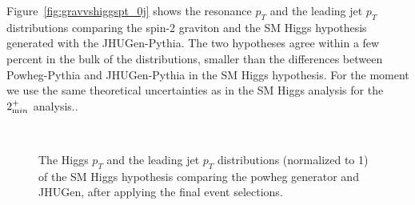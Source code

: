 Figure~\ref{fig:gravvshiggspt_0j} shows the resonance $p_T$ and 
the leading jet $p_T$ distributions comparing the spin-2 
graviton and the SM Higgs hypothesis generated with the JHUGen-Pythia. 
The two hypotheses agree within a few percent in the bulk of the distributions,
smaller than the differences between Powheg-Pythia and JHUGen-Pythia 
in the SM Higgs hypothesis. 
For the moment we use the same theoretical uncertainties as in the SM Higgs 
analysis for the $2_{\text min}^+$ analysis..


\begin{figure}[!hbtp]
\centering
{}
\\
\caption{The Higgs $p_T$ and the leading jet $p_T$ distributions (normalized to 1) of the 
SM Higgs hypothesis comparing the powheg generator and JHUGen, after 
applying the final event selections. }
\label{fig:higgspt_0j}
\end{figure}



